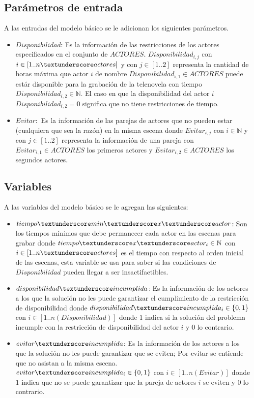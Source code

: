 \documentclass{article}
\begin{document}
\subsection{Parámetros de entrada}
A las entradas del modelo básico se le adicionan los siguientes parámetros.
\begin{itemize}
    \item $Disponibilidad$: Es la información de las restricciones de los actores especificados en el conjunto de $ACTORES$. $Disponibilidad_{i,j}$ con $i \in [1..n\textunderscore actores]$ y con $j \in [1..2]$ representa la cantidad de horas máxima que actor $i$ de nombre $Disponibilidad_{i,1} \in ACTORES$ puede estár disponible para la grabación de la telenovela con tiempo $Disponibilidad_{i,2} \in \mathbb{N} $. El caso en que la disponibilidad del actor $i$  $Disponibilidad_{i,2} = 0$ significa que no tiene restricciones de tiempo.
    \item $Evitar:$ Es la información de las parejas de actores que no 
    pueden estar (cualquiera que sea la razón) en la misma escena donde $Evitar_{i,j}$ con $i \in \mathbb{N}$ y con $j \in [1..2]$ representa la información de una pareja con $Evitar_{i,1} \in ACTORES$ los primeros actores y $Evitar_{i,2} \in ACTORES$ los segundos actores.
\end{itemize}

\subsection{Variables}
A las variables del modelo básico se le agregan las siguientes:
\begin{itemize}
    \item $tiempo\textunderscore min\textunderscore x\textunderscore actor$: Son los tiempos mínimos que debe permanecer cada actor en las escenas para grabar donde $tiempo\textunderscore  x\textunderscore actor_i \in \mathbb{N}$ con $i \in [1..n\textunderscore actores]$ es el tiempo con respecto al orden inicial de las escenas, esta variable se usa para saber si las condiciones de $Disponibilidad$ pueden llegar a ser insactifactibles.
    \item $disponibilidad\textunderscore incumplida$: Es la información de los actores a los que la solución no les puede garantizar el cumplimiento de la restricción de disponibilidad donde $disponibilidad\textunderscore incumplida_i \in \{0,1\}$ con $i \in [1..n(Disponibilidad)]$ donde $1$ indica si la solución del problema incumple con la restricción de disponibilidad del actor $i$ y $0$ lo contrario.
    \item $evitar\textunderscore incumplida$: Es la información de los actores a los que la solución no les puede garantizar que se eviten; Por evitar se entiende que no asistan a la misma escena. $evitar\textunderscore incumplida_i \in \{0,1\}$ con $i \in [1..n(Evitar)]$ donde $1$ indica que no se puede garantizar que la pareja de actores $i$ se eviten y $0$ lo contrario.
\end{itemize}
\end{document}
